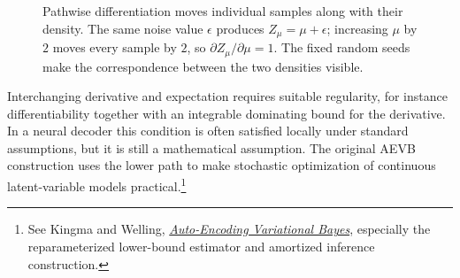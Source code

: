\begin{figure}[H]
\centering
{}
\caption{Pathwise differentiation moves individual samples along with their density. The same noise value $\epsilon$ produces $Z_\mu=\mu+\epsilon$; increasing $\mu$ by $2$ moves every sample by $2$, so $\partial Z_\mu/\partial\mu=1$. The fixed random seeds make the correspondence between the two densities visible.}
\end{figure}

Interchanging derivative and expectation requires suitable regularity, for instance differentiability together with an integrable dominating bound for the derivative. In a neural decoder this condition is often satisfied locally under standard assumptions, but it is still a mathematical assumption. The original AEVB construction uses the lower path to make stochastic optimization of continuous latent-variable models practical.\footnote{See Kingma and Welling, \href{https://arxiv.org/abs/1312.6114}{\emph{Auto-Encoding Variational Bayes}}, especially the reparameterized lower-bound estimator and amortized inference construction.}

